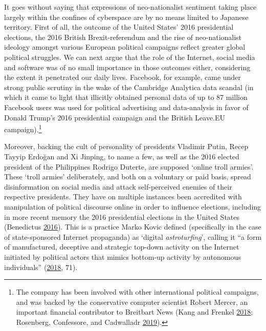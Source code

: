 \documentclass[10pt,british,A4paper,twoside]{memoir}
\begin{document}
It goes without saying that expressions of neo-nationalist sentiment
taking place largely within the confines of cyberspace are by no means
limited to Japanese territory. First of all, the outcome of the United
States' 2016 presidential elections, the 2016 British Brexit-referendum
and the rise of neo-nationalist ideology amongst various European
political campaigns reflect greater global political struggles. We can
next argue that the role of the Internet, social media and software was
of no small importance in those outcomes either, considering the extent
it penetrated our daily lives. Facebook, for example, came under strong
public scrutiny in the wake of the Cambridge Analytica data scandal (in
which it came to light that illicitly obtained personal data of up to 87
million Facebook users was used for political advertising and
data-analysis in favor of Donald Trump's 2016 presidential campaign and
the British Leave.EU campaign).\footnote{The company has been involved
  with other international political campaigns, and was backed by the
  conservative computer scientist Robert Mercer, an important financial
  contributor to Breitbart News (Kang and Frenkel
  \protect\hyperlink{ref-kang_facebook_2018}{2018}; Rosenberg,
  Confessore, and Cadwalladr
  \protect\hyperlink{ref-rosenberg_how_2019}{2019}).}

Moreover, backing the cult of personality of presidents Vladimir Putin,
Recep Tayyip Erdoğan and Xi Jinping, to name a few, as well as the 2016
elected president of the Philippines Rodrigo Duterte, are supposed
`online troll armies'. These `troll armies' deliberately, and both on a
voluntary or paid basis, spread disinformation on social media and
attack self-perceived enemies of their respective presidents. They have
on multiple instances been accredited with manipulation of political
discourse online in order to influence elections, including in more
recent memory the 2016 presidential elections in the United States
(Benedictus \protect\hyperlink{ref-benedictus_invasion_2016}{2016}). This is a
practice Marko Kovic defined (specifically in the case of state-sponsored Internet
propaganda) as `digital \emph{astroturfing}', calling it ``a form of
manufactured, deceptive and strategic top-down activity on the Internet
initiated by political actors that mimics bottom-up activity by
autonomous individuals''
(\protect\hyperlink{ref-kovic_digital_2018}{2018}, 71).
\end{document}
